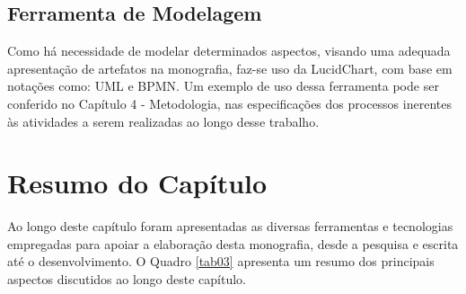 \subsection{Ferramenta de Modelagem}
\label{sec:Ferramenta de Modelagem}
Como há necessidade de modelar determinados aspectos, visando uma adequada apresentação de artefatos na monografia, faz-se uso da LucidChart, com base em notações como: UML e BPMN. Um exemplo de 
uso dessa ferramenta pode ser conferido no Capítulo 4 - Metodologia, nas especificações dos processos inerentes às atividades a serem realizadas ao longo desse trabalho.

\section{Resumo do Capítulo}
\label{sec:Resumo do Capítulo 2}
Ao longo deste capítulo foram apresentadas as diversas ferramentas e tecnologias empregadas para apoiar a elaboração desta monografia, desde a pesquisa e escrita até o desenvolvimento. 
O Quadro \ref{tab03} apresenta um resumo dos principais aspectos discutidos ao longo deste capítulo.

